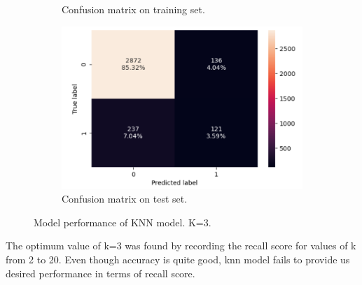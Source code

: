 \documentclass[12pt,a4paper]{article}
\begin{document}
\begin{figure}[h]
\begin{subfigure}[t]{0.5\textwidth}
			\caption{Confusion matrix on training set.}
			\label{fig:Knn3_c_Matrix_train}
		\end{subfigure}
		\hfill
		\begin{subfigure}[t]{0.45\textwidth}
			\includegraphics[width=\textwidth]{Knn3_c_Matrix_test.png}
			\caption{Confusion matrix on test set.}
			\label{fig: Knn3_c_Matrix_test}
		\end{subfigure}
		\caption{Model performance of KNN model. K=3.}
		\label{fig: Distribution of nmerical variables }
	\end{figure}	
	The optimum value of k=3 was found by recording the recall score for values of k from 2 to 20. Even though accuracy is quite good, knn model fails to provide us desired performance in terms of recall score. 
\end{document}
